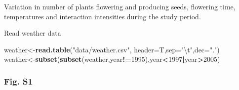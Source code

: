\documentclass[
]{article}
\newenvironment{Shaded}{\begin{snugshade}}{\end{snugshade}}
\newcommand{\CharTok}[1]{\textcolor[rgb]{0.31,0.60,0.02}{#1}}
\newcommand{\DataTypeTok}[1]{\textcolor[rgb]{0.13,0.29,0.53}{#1}}
\newcommand{\DecValTok}[1]{\textcolor[rgb]{0.00,0.00,0.81}{#1}}
\newcommand{\KeywordTok}[1]{\textcolor[rgb]{0.13,0.29,0.53}{\textbf{#1}}}
\newcommand{\NormalTok}[1]{#1}
\newcommand{\OperatorTok}[1]{\textcolor[rgb]{0.81,0.36,0.00}{\textbf{#1}}}
\newcommand{\StringTok}[1]{\textcolor[rgb]{0.31,0.60,0.02}{#1}}
\begin{document}
Variation in number of plants flowering and producing seeds, flowering
time, temperatures and interaction intensities during the study period.

Read weather data

\begin{Shaded}
\begin{Highlighting}[]
\NormalTok{weather\textless{}{-}}\KeywordTok{read.table}\NormalTok{(}\StringTok{"data/weather.csv"}\NormalTok{,}
                    \DataTypeTok{header=}\NormalTok{T,}\DataTypeTok{sep=}\StringTok{"}\CharTok{\textbackslash{}t}\StringTok{"}\NormalTok{,}\DataTypeTok{dec=}\StringTok{"."}\NormalTok{) }
\NormalTok{weather\textless{}{-}}\KeywordTok{subset}\NormalTok{(}\KeywordTok{subset}\NormalTok{(weather,year}\OperatorTok{!=}\DecValTok{1995}\NormalTok{),year}\OperatorTok{\textless{}}\DecValTok{1997}\OperatorTok{|}\NormalTok{year}\OperatorTok{\textgreater{}}\DecValTok{2005}\NormalTok{)}
\end{Highlighting}
\end{Shaded}

\hypertarget{fig.-s1}{%
\subsubsection{Fig. S1}\label{fig.-s1}}
\end{document}

